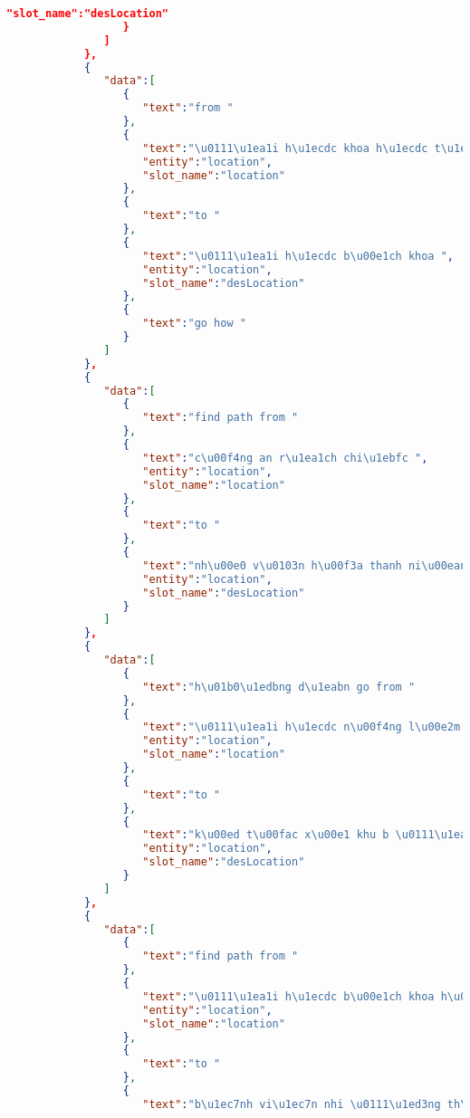 \begin{lstlisting}[language=json,firstnumber=1]
                     "slot_name":"desLocation"
                  }
               ]
            },
            {
               "data":[
                  {
                     "text":"from "
                  },
                  {
                     "text":"\u0111\u1ea1i h\u1ecdc khoa h\u1ecdc t\u1ef1 nhi\u00ean ",
                     "entity":"location",
                     "slot_name":"location"
                  },
                  {
                     "text":"to "
                  },
                  {
                     "text":"\u0111\u1ea1i h\u1ecdc b\u00e1ch khoa ",
                     "entity":"location",
                     "slot_name":"desLocation"
                  },
                  {
                     "text":"go how "
                  }
               ]
            },
            {
               "data":[
                  {
                     "text":"find path from "
                  },
                  {
                     "text":"c\u00f4ng an r\u1ea1ch chi\u1ebfc ",
                     "entity":"location",
                     "slot_name":"location"
                  },
                  {
                     "text":"to "
                  },
                  {
                     "text":"nh\u00e0 v\u0103n h\u00f3a thanh ni\u00ean th\u00e0nh ph\u1ed1 ",
                     "entity":"location",
                     "slot_name":"desLocation"
                  }
               ]
            },
            {
               "data":[
                  {
                     "text":"h\u01b0\u1edbng d\u1eabn go from "
                  },
                  {
                     "text":"\u0111\u1ea1i h\u1ecdc n\u00f4ng l\u00e2m ",
                     "entity":"location",
                     "slot_name":"location"
                  },
                  {
                     "text":"to "
                  },
                  {
                     "text":"k\u00ed t\u00fac x\u00e1 khu b \u0111\u1ea1i h\u1ecdc qu\u1ed1c gia ",
                     "entity":"location",
                     "slot_name":"desLocation"
                  }
               ]
            },
            {
               "data":[
                  {
                     "text":"find path from "
                  },
                  {
                     "text":"\u0111\u1ea1i h\u1ecdc b\u00e1ch khoa h\u00e0 n\u1ed9i ",
                     "entity":"location",
                     "slot_name":"location"
                  },
                  {
                     "text":"to "
                  },
                  {
                     "text":"b\u1ec7nh vi\u1ec7n nhi \u0111\u1ed3ng th\u00e0nh ph\u1ed1 ",

\end{lstlisting}
